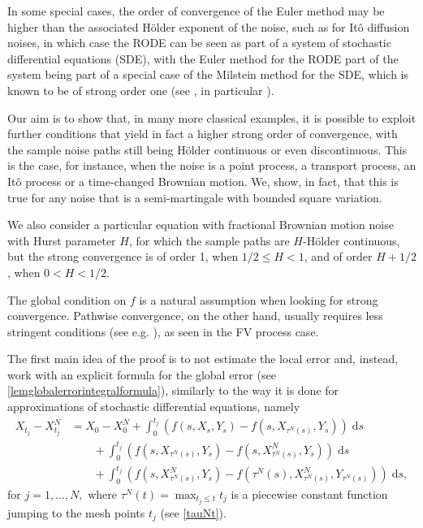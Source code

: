 \documentclass[reqno,12pt]{amsart}
\theoremstyle{plain} %
\theoremstyle{definition} %
\begin{document}
In some special cases, the order of convergence of the Euler method may be higher than the associated H\"older exponent of the noise, such as for It\^o diffusion noises, in which case the RODE can be seen as part of a system of stochastic differential equations (SDE), with the Euler method for the RODE part of the system being part of a special case of the Milstein method for the SDE, which is known to be of strong order one (see \cite[Section 5]{WangCaoHanKloeden2021}, in particular \cite[Section 5.2, Example 12 and Remark 13]{WangCaoHanKloeden2021}).

Our aim is to show that, in many more classical examples, it is possible to exploit further conditions that yield in fact a higher strong order of convergence, with the sample noise paths still being H\"older continuous or even discontinuous. This is the case, for instance, when the noise is a point process, a transport process, an It\^o process or a time-changed Brownian motion. We, show, in fact, that this is true for any noise that is a semi-martingale with bounded square variation.

We also consider a particular equation with fractional Brownian motion noise with Hurst parameter $H$, for which the sample paths are $H$-H\"older continuous, but the strong convergence is of order 1, when $1/2 \leq H < 1$, and of order $H + 1/2$, when $0 < H < 1/2$.

The global condition on $f$ is a natural assumption when looking for strong convergence. Pathwise convergence, on the other hand, usually requires less stringent conditions (see e.g. \cite{JentzenKloedenNeuenkirch2009, JentzenKloeden2011}), as seen in the FV process case.

The first main idea of the proof is to not estimate the local error and, instead, work with an explicit formula for the global error (see \cref{lemglobalerrorintegralformula}), similarly to the way it is done for approximations of stochastic differential equations, namely
\begin{equation}
    \label{lemglobalerrorintegralformulaintro}
    \begin{aligned}
        X_{t_j} - X_{t_j}^N & = X_0 - X_0^N + \int_0^{t_j} \left( f(s, X_s, Y_s) - f(s, X_{\tau^N(s)}, Y_s) \right)\;\mathrm{d}s  \\ 
        & \qquad + \int_{0}^{t_j} \left( f(s, X_{\tau^N(s)}, Y_s) - f(s, X_{\tau^N(s)}^N, Y_s) \right)\;\mathrm{d}s \\
        & \qquad + \int_0^{t_j} \left( f(s, X_{\tau^N(s)}^N, Y_s) - f(\tau^N(s), X_{\tau^N(s)}^N, Y_{\tau^N(s)}) \right)\;\mathrm{d}s,
    \end{aligned}
\end{equation}
for $j = 1, \ldots, N,$ where $\tau^N(t) = \max_{t_j \leq t} t_j$ is a piecewise constant function jumping to the mesh points $t_j$ (see \eqref{tauNt}).
\end{document}
